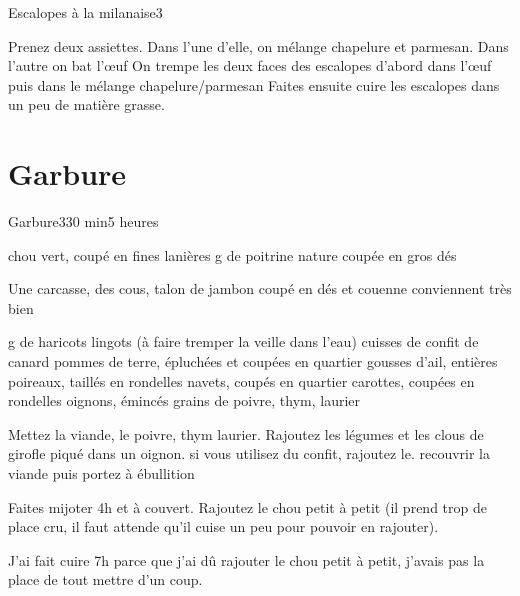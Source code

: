 {\begin{recette}{Escalopes à la milanaise}{3}{}{}
\begin{preparation}
\etape Prenez deux assiettes. Dans l'une d'elle, on mélange chapelure et parmesan. Dans l'autre on bat l'œuf
\etape On trempe les deux faces des escalopes d'abord dans l'œuf puis dans le mélange chapelure/parmesan
\etape Faites ensuite cuire les escalopes dans un peu de matière grasse.
\end{preparation}
\end{recette}


\section{Garbure}
\begin{recette}{Garbure}{3}{30 min}{5 heures}
\begin{ingredients}
 chou vert, coupé en fines lanières
 g de poitrine nature coupée en gros dés
\begin{remarque}
Une carcasse, des cous, talon de jambon coupé en dés et couenne conviennent très bien
\end{remarque}

 g de haricots lingots (à faire tremper la veille dans l’eau) 
 cuisses de confit de canard
 pommes de terre, épluchées et coupées en quartier
 gousses d’ail, entières
 poireaux, taillés en rondelles
 navets, coupés en quartier
 carottes, coupées en rondelles
 oignons, émincés
 grains de poivre, thym, laurier
\end{ingredients}


\begin{preparation}
\etape Mettez la viande, le poivre, thym laurier.
\etape Rajoutez les légumes et les clous de girofle piqué dans un oignon. 
\etape si vous utilisez du confit, rajoutez le.
\etape recouvrir la viande puis portez à ébullition
\end{preparation}

\begin{cuisson}
Faites mijoter 4h et à couvert. Rajoutez le chou petit à petit (il prend trop de place cru, il faut attende qu'il cuise un peu pour pouvoir en rajouter). 

J'ai fait cuire 7h parce que j'ai dû rajouter le chou petit à petit, j'avais pas la place de tout mettre d'un coup.
\end{cuisson}
\end{recette}


}
